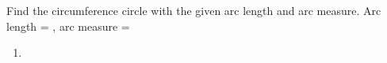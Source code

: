 Find the circumference circle with the given arc length and arc measure.
\newline
Arc length = , arc measure = \degree
\newline
\begin{enumerate}
    \item
\end{enumerate}

